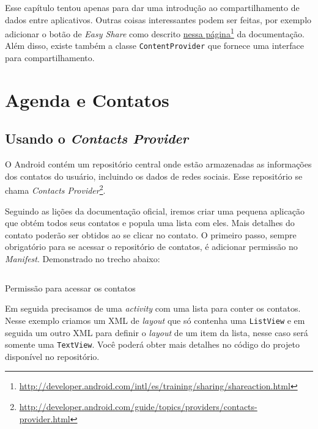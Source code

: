 \documentclass[a4paper,12pt,brazil,oneside]{book}
\begin{document}
		Esse capítulo tentou apenas para dar uma introdução ao compartilhamento de dados entre aplicativos. Outras coisas interessantes podem ser feitas, por exemplo adicionar o botão de \emph{Easy Share} como descrito \href{http://developer.android.com/intl/es/training/sharing/shareaction.html}{nessa página}\footnote{\href{http://developer.android.com/intl/es/training/sharing/shareaction.html}{http://developer.android.com/intl/es/training/sharing/shareaction.html}} da documentação. Além disso, existe também a classe \texttt{ContentProvider} que fornece uma interface para compartilhamento.

\chapter{Agenda e Contatos} 
	\section{Usando o \emph{Contacts Provider}}

	O Android contém um repositório central onde estão armazenadas as informações dos contatos do usuário, incluindo os dados de redes sociais. Esse repositório se chama \emph{Contacts Provider}\footnote{\href{http://developer.android.com/guide/topics/providers/contacts-provider.html}{http://developer.android.com/guide/topics/providers/contacts-provider.html}}.	
	
	Seguindo as lições da documentação oficial, iremos criar uma pequena aplicação que obtém todos seus contatos e popula uma lista com eles. Mais detalhes do contato poderão ser obtidos ao se clicar no contato. O primeiro passo, sempre obrigatório para se acessar o repositório de contatos, é adicionar permissão no \emph{Manifest}. Demonstrado no trecho abaixo:	

		\begin{listing}[H]
		\inputminted[linenos=true,fontsize=\small,frame=lines, framesep=2mm, tabsize=2,numbersep=5pt]{xml}{src/api/contacts/permission.xml}
		\caption{Permissão para acessar os contatos}
		\label{code:contactpermission}
		\end{listing} 	
	
	Em seguida precisamos de uma \emph{activity} com uma lista para conter os contatos. Nesse exemplo criamos um XML de \emph{layout} que só contenha uma \texttt{ListView} e em seguida um outro XML para definir o \emph{layout} de um item da lista, nesse caso será somente uma \texttt{TextView}. Você poderá obter mais detalhes no código do projeto disponível no repositório.
\end{document}
